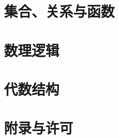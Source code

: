 \documentclass[
  scope=course,
  profile=standard,
  style=boxed,
  color=full,
  figures=inline
]{lc-lecture}
\begin{document}
\maketitle
\tableofcontents

\part{集合、关系与函数}





\part{数理逻辑}



\part{代数结构}



\clearpage
\part*{附录与许可}
\end{document}
